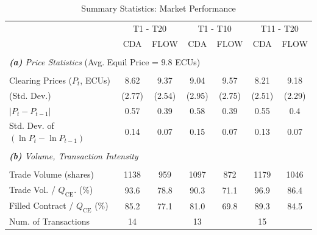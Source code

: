 \begin{table}
    \centering
    \caption{Summary Statistics: Market Performance}
    \renewcommand{\arraystretch}{1.1}
    \begin{threeparttable}
    \begin{tabular}{lcccccc}
    
    \toprule
    
    ~                               & \multicolumn{2}{c}{T1 - T20} & \multicolumn{2}{c}{T1 - T10}  & \multicolumn{2}{c}{T11 - T20} \\
                                    & CDA       & FLOW      & CDA       & FLOW      & CDA       & FLOW      \\
    \midrule 
     \\[-1.8ex] 
     \multicolumn{7}{l}{\textit{\textbf{(a)} Price Statistics} (Avg. Equil Price = $9.8$ ECUs)} \\
     \\[-1.8ex]    
     Clearing Prices ($P_t$, ECUs)              & 8.62      & 9.37      & 9.04      & 9.57      & 8.21      & 9.18      \\
     \hspace{3mm}(Std. Dev.)                    & (2.77)    & (2.54)    & (2.95)    & (2.75)    & (2.51)    & (2.29)    \\
     $ \lvert  P_{t}-P_{t - 1} \rvert $         & 0.57      & 0.39      & 0.58      & 0.39      & 0.55      & 0.4       \\
     Std. Dev. of $(\ln P_{t} - \ln P_{t - 1})$ & 0.14      & 0.07      & 0.15      & 0.07      & 0.13      & 0.07      \\     
     \\ [-1.8ex]
     \multicolumn{7}{l}{\textit{\textbf{(b)} Volume, Transaction Intensity}} \\
     \\ [-1.8ex]
     Trade Volume (shares)                     & 1138      & 959       & 1097      & 872       & 1179      & 1046      \\
     Trade Vol. / $Q_{\text{CE}}$. (\%)        & 93.6      & 78.8      & 90.3      & 71.1      & 96.9      & 86.4      \\
     Filled Contract / $Q_{\text{CE}}$ (\%)     & 85.2      & 77.1      & 81.0      & 69.8      & 89.3      & 84.5      \\
     Num. of Transactions                             & 14        &           & 13        &           & 15        &           \\

\end{tabular}
\end{threeparttable}
\end{table}

